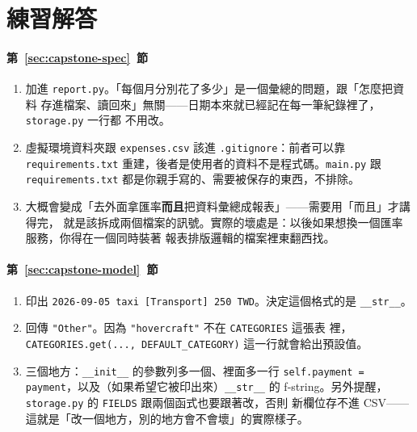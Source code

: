 \section*{練習解答}

\paragraph{第~\ref{sec:capstone-spec}~節}
\begin{enumerate}
\item 加進 \texttt{report.py}。「每個月分別花了多少」是一個彙總的問題，跟「怎麼把資料
存進檔案、讀回來」無關——日期本來就已經記在每一筆紀錄裡了，\texttt{storage.py} 一行都
不用改。
\item 虛擬環境資料夾跟 \texttt{expenses.csv} 該進 \texttt{.gitignore}：前者可以靠
\texttt{requirements.txt} 重建，後者是使用者的資料不是程式碼。\texttt{main.py} 跟
\texttt{requirements.txt} 都是你親手寫的、需要被保存的東西，不排除。
\item 大概會變成「去外面拿匯率\textbf{而且}把資料彙總成報表」——需要用「而且」才講得完，
就是該拆成兩個檔案的訊號。實際的壞處是：以後如果想換一個匯率服務，你得在一個同時裝著
報表排版邏輯的檔案裡東翻西找。
\end{enumerate}

\paragraph{第~\ref{sec:capstone-model}~節}
\begin{enumerate}
\item 印出 \texttt{2026-09-05 taxi [Transport] 250 TWD}。決定這個格式的是
\texttt{\_\_str\_\_}。
\item 回傳 \texttt{"Other"}。因為 \texttt{"hovercraft"} 不在 \texttt{CATEGORIES} 這張表
裡，\texttt{CATEGORIES.get(..., DEFAULT\_CATEGORY)} 這一行就會給出預設值。
\item 三個地方：\texttt{\_\_init\_\_} 的參數列多一個、裡面多一行
\texttt{self.payment = payment}，以及（如果希望它被印出來）\texttt{\_\_str\_\_} 的
f-string。另外提醒，\texttt{storage.py} 的 \texttt{FIELDS} 跟兩個函式也要跟著改，否則
新欄位存不進 CSV——這就是「改一個地方，別的地方會不會壞」的實際樣子。
\end{enumerate}

